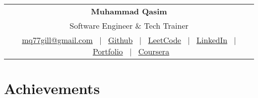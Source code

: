\documentclass[a4paper,12pt]{article}
\begin{document}
\pagestyle{empty} 



\begin{tabularx}{\linewidth}{@{} C @{}}
    {\Huge \textbf{Muhammad Qasim}} \\[6pt]
    {\large Software Engineer \& Tech Trainer} \\[10pt]

    \href{mailto:mq77gill@gmail.com}{mq77gill@gmail.com} \ $|$ \ 
    \href{https://github.com/Qasim-Gill}{Github} \ $|$ \ 
    \href{https://leetcode.com/u/MuhammadQasim007/}{LeetCode} \ $|$ \ 
    \href{https://www.linkedin.com/in/muhammad-qasim-gill/}{LinkedIn} \ $|$ \ 
    \href{https://muhammad-qasim.netlify.app/}{Portfolio} \ $|$ \ 
    \href{https://www.coursera.org/learner/muhammad-qasim}{Coursera} \\
\end{tabularx}




\section{Achievements}
\end{document}

